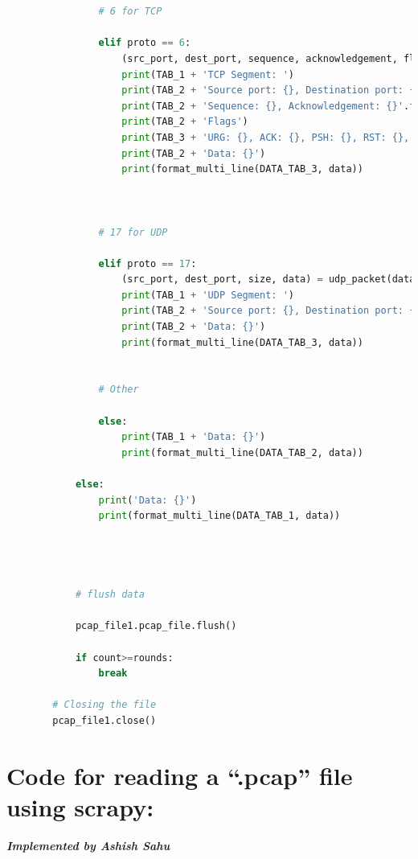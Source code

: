 \documentclass[12pt, a4paper]{report}
\begin{document}
\begin{lstlisting}[language=Python, style=chstyle]
  
                
                # 6 for TCP

                elif proto == 6:
                    (src_port, dest_port, sequence, acknowledgement, flag_urg, flag_ack, flag_psh, flag_rst, flag_syn, flag_fin, data) = tcp_packet(data)
                    print(TAB_1 + 'TCP Segment: ')
                    print(TAB_2 + 'Source port: {}, Destination port: {}'.format(src_port, dest_port))
                    print(TAB_2 + 'Sequence: {}, Acknowledgement: {}'.format(sequence, acknowledgement))
                    print(TAB_2 + 'Flags')
                    print(TAB_3 + 'URG: {}, ACK: {}, PSH: {}, RST: {}, SYN: {}, FIN: {}'.format(flag_urg, flag_ack, flag_psh, flag_rst, flag_syn, flag_fin))
                    print(TAB_2 + 'Data: {}')
                    print(format_multi_line(DATA_TAB_3, data))

 

                # 17 for UDP     

                elif proto == 17:
                    (src_port, dest_port, size, data) = udp_packet(data)
                    print(TAB_1 + 'UDP Segment: ')
                    print(TAB_2 + 'Source port: {}, Destination port: {}, Length: {}'.format(src_port, dest_port, size))
                    print(TAB_2 + 'Data: {}')
                    print(format_multi_line(DATA_TAB_3, data))

 
                # Other     

                else:
                    print(TAB_1 + 'Data: {}')
                    print(format_multi_line(DATA_TAB_2, data))

            else:
                print('Data: {}')
                print(format_multi_line(DATA_TAB_1, data))


 

            # flush data

            pcap_file1.pcap_file.flush()

            if count>=rounds:
                break

        # Closing the file
        pcap_file1.close()

\end{lstlisting}
\pagebreak
\section{Code for reading a “.pcap” file using scrapy:}
\emph{\large \textbf{Implemented by Ashish Sahu\\}}
\end{document}
